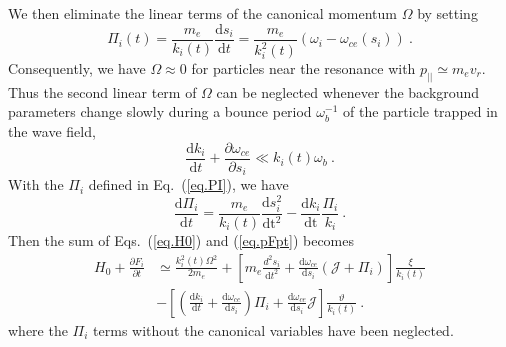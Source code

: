 We then eliminate the  linear terms of the canonical momentum $\Omega$ by setting 
\begin{equation}\label{eq.PI}
    \Pi_i(t) = \frac{m_e}{k_i(t)}\frac{\mathrm{d} s_i}{\mathrm{d} t} = \frac{m_e}{k_i^2(t)}(\omega_i - \omega_{ce}(s_i))~.
\end{equation}
Consequently, we have $\Omega \approx 0$ for particles near the resonance with $p_{||}\simeq m_e v_r$.
Thus the second linear term of $\Omega$ can be neglected whenever the background parameters change slowly 
during a bounce period $\omega_b^{-1}$ of the particle trapped in the  wave field, 
\begin{equation}
    \frac{\mathrm{d} k_i}{\mathrm{d} t} + \frac{\partial \omega_{ce}}{\partial s_i} \ll k_i(t) \omega_b~.
\end{equation}
With the $\Pi_i$ defined in Eq.~(\ref{eq.PI}), we have
\begin{equation}
    \frac{\mathrm{d}\Pi_i}{\mathrm{d}t} = \frac{m_e}{k_i(t)}\frac{\mathrm{d}s_i^2}{\mathrm{d t^2}} - \frac{\mathrm{d}k_i}{\mathrm{d t}}\frac{\Pi_i}{k_i}~.
\end{equation}
Then the sum of Eqs.~(\ref{eq.H0}) and (\ref{eq.pFpt}) becomes
\begin{equation}\label{eq.merge}
    \begin{aligned}
        H_0 + \frac{\partial F_i}{\partial t}& \simeq \frac{k_{i}^{2}(t) \Omega^{2}}{2 m_{e}} 
        + \left[m_{e} \frac{d^{2} s_{i}}{\mathrm{d}t^{2}}+\frac{\mathrm{d}\omega_{c e}}{\mathrm{d}s_{i}}\left(\mathcal{J}+\Pi_{i}\right)\right] \frac{\xi}{k_{i}(t)} 
        \\
        &-\left[\left(\frac{\mathrm{d}k_{i}}{\mathrm{d}t}+\frac{\mathrm{d}\omega_{c e}}{\mathrm{d}s_{i}}\right) \Pi_{i}+\frac{\mathrm{d}\omega_{c e}}{\mathrm{d}s_{i}} \mathcal{J}\right] \frac{\vartheta}{k_{i}(t)} ~.
    \end{aligned}
\end{equation}
where the  $ \Pi_i$ terms without the canonical variables 
have been neglected.



